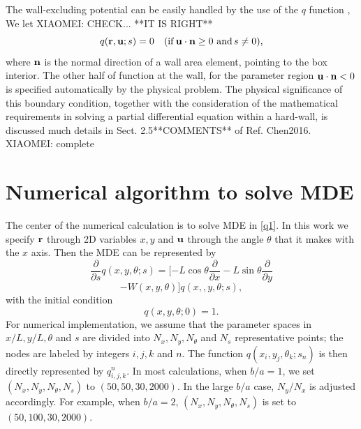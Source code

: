 \documentclass[pre,twocolumn,preprintnumbers,reprint]{revtex4}
\newcommand{\bu}{{\bf u}}
\newcommand{\br}{{\bf r}}
\newcommand{\be}{\begin{equation}}
\newcommand{\en}{\end{equation}}
\newcommand*{\citen}{}%
\DeclareRobustCommand*{\citen}[1]{%
  \begingroup
    \romannumeral-`\x %
    \setcitestyle{numbers}%
    \cite{#1}%
  \endgroup
}
\begin{document}
The wall-excluding potential can be easily handled by the use of the $q$ function \cite{Chen1995,Chen2013}, We let {XIAOMEI: CHECK... }**IT IS RIGHT**
\begin{equation}\label{q8}
    q(\br,\bu;s)=0 \quad ({\rm if}\,\bu \cdot  {\bf n}\ge 0\,\,{\rm and}\,s\neq0),
\end{equation}
where $\bf n$ is the normal direction of a wall area element, pointing to the box interior. The other half of function at the wall, for the parameter region $\bu \cdot  {\bf n}<0$ is specified automatically by the physical problem. The physical significance of this boundary condition, together with the consideration of the mathematical requirements in solving a partial differential equation within a hard-wall, is discussed much details in Sect. 2.5**COMMENTS** of Ref. \citen{Chen2016}. {XIAOMEI: complete}

\section*{Numerical algorithm to solve MDE}

The center of the numerical calculation is to solve MDE in \eqref{q1}. In this work we specify $\br$ through 2D variables $x,y$ and $\bu$ through the angle $\theta$ that it makes with the $x$ axis. Then the MDE can be represented by
\[
\frac{\partial}{\partial s}q(x,y,\theta;s)=[-L\cos\theta\frac{\partial}{\partial x}-L\sin\theta\frac{\partial}{\partial y}\]
\be\label{q7}
-W(x,y,\theta)]q(x,,y,\theta;s),
\en
with the initial condition
\be
q(x,y,\theta;0)=1.
\en
For numerical implementation, we assume that the parameter spaces in $x/L, y/L, \theta$ and $s$ are divided into $N_x, N_y, N_\theta$ and $N_s$ representative points; the nodes are labeled by integers $i,j,k$ and $n$. The function $q(x_i,y_j,\theta_k;s_n)$ is then directly represented by $q^n_{i,j,k}$. In most calculations, when $b/a=1$, we set $(N_x,N_y,N_\theta,N_s)$ to $(50,50,30,2000)$. In the large $b/a$ case, $N_y/N_x$ is adjusted accordingly. For example, when $b/a=2$, $(N_x,N_y,N_\theta,N_s)$ is set to $(50,100,30,2000)$.
\end{document}
